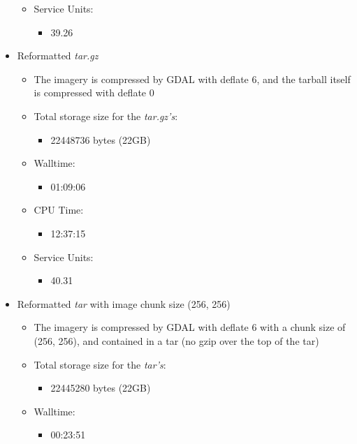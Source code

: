 \documentclass[a4paper]{article}
\begin{document}
\begin{itemize}
\begin{itemize}
        \item Service Units:
          \begin{itemize}
            \item 39.26
          \end{itemize}
      \end{itemize}
      \item Reformatted \textit{tar.gz}
      \begin{itemize}
        \item The imagery is compressed by GDAL with deflate 6, and the tarball itself is compressed with deflate 0
        \item Total storage size for the \textit{tar.gz’s}:
          \begin{itemize}
            \item 22448736 bytes (22GB)
          \end{itemize}
        \item Walltime:
          \begin{itemize}
            \item 01:09:06
          \end{itemize}
        \item CPU Time:
          \begin{itemize}
            \item 12:37:15
          \end{itemize}
        \item Service Units:
          \begin{itemize}
            \item 40.31
          \end{itemize}
      \end{itemize}
      \item Reformatted \textit{tar} with image chunk size (256, 256)
      \begin{itemize}
        \item The imagery is compressed by GDAL with deflate 6 with a chunk size of (256, 256), and contained in a tar (no gzip over the top of the tar)
        \item Total storage size for the \textit{tar’s}:
          \begin{itemize}
            \item 22445280 bytes (22GB)
          \end{itemize}
        \item Walltime:
          \begin{itemize}
            \item 00:23:51

\end{itemize}
\end{itemize}
\end{itemize}
\end{document}
